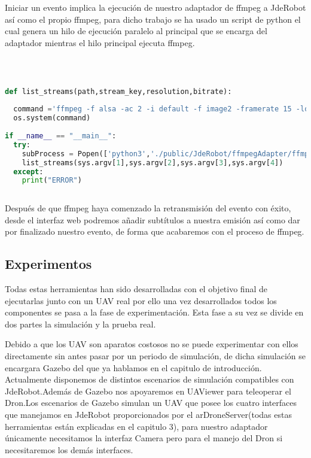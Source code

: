Iniciar un evento implica la ejecución de nuestro adaptador de ffmpeg a JdeRobot así como el propio ffmpeg, para dicho trabajo se ha usado un script de python el cual genera un hilo de ejecución paralelo al principal que se encarga del adaptador mientras el hilo principal ejecuta ffmpeg.

\\
\begin{lstlisting}[language=Python]

def list_streams(path,stream_key,resolution,bitrate):
  
  command ='ffmpeg -f alsa -ac 2 -i default -f image2 -framerate 15 -loop 1 -i ' + path + ' -vcodec libx264 -preset veryfast -minrate ' + bitrate  + ' -maxrate 1000k -bufsize 1000k -vf "format=yuv420p"  -g 30 -vf drawtext="fontfile=/usr/share/fonts/truetype/freefont/FreeSerif.ttf:fontsize=24:fontcolor=yellow:textfile=./public/static/subtitles.txt:reload=1:x=100:y=50" -c:a libmp3lame -b:a 128k -ar 44100 -force_key_frames 0:00:04 -f flv rtmp://a.rtmp.youtube.com/live2/'+ stream_key
  os.system(command)
  
if __name__ == "__main__":
  try:
    subProcess = Popen(['python3','./public/JdeRobot/ffmpegAdapter/ffmpeg-adapter.py', '--Ice.Config=./public/JdeRobot/ffmpegAdapter/adapter_conf.cfg'])
    list_streams(sys.argv[1],sys.argv[2],sys.argv[3],sys.argv[4])
  except:
    print("ERROR")
    
\end{lstlisting}

Después de que ffmpeg haya comenzado la retransmisión del evento con éxito, desde el interfaz web podremos añadir subtítulos a nuestra emisión así como dar por finalizado nuestro evento, de forma que acabaremos con el proceso de ffmpeg. 

\subsection{Experimentos}

Todas estas herramientas han sido desarrolladas con el objetivo final de ejecutarlas junto con un UAV real por ello una vez desarrollados todos los componentes se pasa a la fase de experimentación. Esta fase a su vez se divide en dos partes la simulación y la prueba real.

Debido a que los UAV son aparatos costosos no se puede experimentar con ellos directamente sin antes pasar por un periodo de simulación, de dicha simulación se encargara Gazebo del que ya hablamos en el capitulo de introducción. Actualmente disponemos de distintos escenarios de simulación compatibles con JdeRobot.Además de Gazebo nos apoyaremos en UAViewer para teleoperar el Dron.Los escenarios de Gazebo simulan  un UAV que posee los cuatro interfaces que manejamos en JdeRobot proporcionados por el arDroneServer(todas estas herramientas están explicadas en el capitulo 3), para nuestro adaptador únicamente necesitamos la interfaz Camera pero para el manejo del Dron si necesitaremos los demás interfaces.

